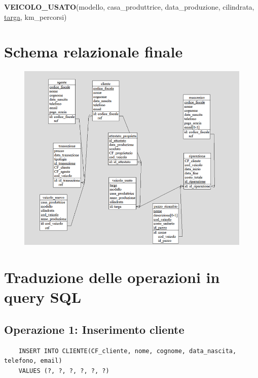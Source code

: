 \documentclass[a4paper,12pt]{report}
\begin{document}
\noindent
\textbf{VEICOLO\_USATO}(modello, casa\_produttrice, data\_produzione, cilindrata, \underline{targa}, km\_percorsi)\\

\section{Schema relazionale finale}
	\begin{figure}[H]
		\centering
		\includegraphics[scale=0.9]{img/schema_rel.png}
	\end{figure}

\section{Traduzione delle operazioni in query SQL}

\subsection*{Operazione 1: Inserimento cliente}
\begin{lstlisting}
	INSERT INTO CLIENTE(CF_cliente, nome, cognome, data_nascita, telefono, email) 
	VALUES (?, ?, ?, ?, ?, ?)
\end{lstlisting}
\end{document}
